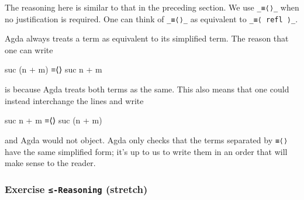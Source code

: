 \begin{fence}
\begin{code}
\AgdaSymbol{(}\AgdaSpace{}%
\AgdaOperator{\AgdaFunction{+}}\AgdaSpace{}%
\AgdaSymbol{)}\<%
\\
%
\>[2]\AgdaSpace{}%
\AgdaSpace{}%
\AgdaSpace{}%
\AgdaSymbol{(}\AgdaSpace{}%
\AgdaSpace{}%
\AgdaSymbol{)}\AgdaSpace{}%
\<%
\\
\>[2][@{}l@{\AgdaIndent{0}}]%
\>[4]\AgdaSpace{}%
\AgdaSymbol{(}\AgdaSpace{}%
\AgdaOperator{\AgdaFunction{+}}\AgdaSpace{}%
\AgdaSymbol{)}\<%
\\
%
\>[2]\<%
\\
\>[2][@{}l@{\AgdaIndent{0}}]%
\>[4]\AgdaSpace{}%
\AgdaSpace{}%
\AgdaOperator{\AgdaFunction{+}}\AgdaSpace{}%
\<%
\\
%
\>[2]\<%
\end{code}
\end{fence}

The reasoning here is similar to that in the preceding section. We use
\texttt{\_≡⟨⟩\_} when no justification is required. One can think of
\texttt{\_≡⟨⟩\_} as equivalent to \texttt{\_≡⟨\ refl\ ⟩\_}.

Agda always treats a term as equivalent to its simplified term. The
reason that one can write

\begin{myDisplay}
  suc (n + m)
≡⟨⟩
  suc n + m
\end{myDisplay}

is because Agda treats both terms as the same. This also means that one
could instead interchange the lines and write

\begin{myDisplay}
  suc n + m
≡⟨⟩
  suc (n + m)
\end{myDisplay}

and Agda would not object. Agda only checks that the terms separated by
\texttt{≡⟨⟩} have the same simplified form; it's up to us to write them
in an order that will make sense to the reader.

\hypertarget{exercise--reasoning-stretch}{%
\subsubsection{\texorpdfstring{Exercise \texttt{≤-Reasoning}
(stretch)}{Exercise ≤-Reasoning (stretch)}}\label{exercise--reasoning-stretch}}

